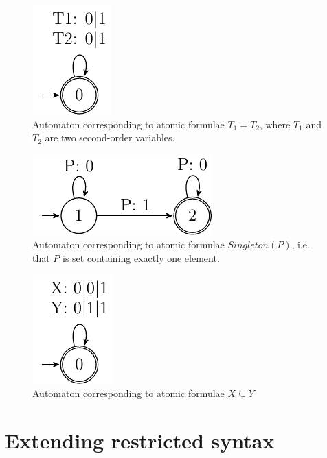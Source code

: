 \begin{figure}[h!]
 \begin{center}
  \includegraphics{fig/atomic-equal-terms}
 \end{center}
 \caption{Automaton corresponding to atomic formulae $T_1 = T_2$, where $T_1$
 and $T_2$ are two second-order variables.}
\end{figure}

\begin{figure}[h!]
 \begin{center}
  \includegraphics{fig/atomic-singleton}
 \end{center}
 \caption{Automaton corresponding to atomic formulae $\mathit{Singleton}(P)$,
 i.e. that $P$ is set containing exactly one element.}
\end{figure}

\begin{figure}[h!]
 \begin{center}
  \includegraphics{fig/atomic-subset}
 \end{center}
 \caption{Automaton corresponding to atomic formulae $X \subseteq Y$}
\end{figure}

\section{Extending restricted syntax}


